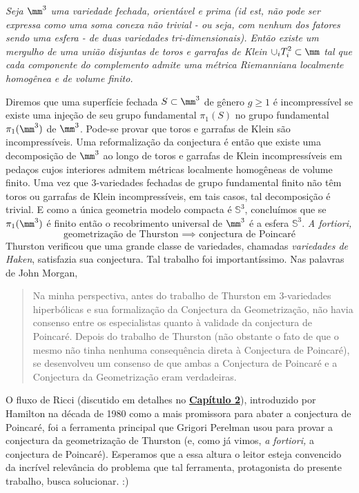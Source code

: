 \begin{conjec} \textit{
Seja $\mm^3$ uma variedade fechada, orientável e prima (id est, não pode ser expressa como uma soma conexa não trivial - ou seja, com nenhum dos fatores sendo uma esfera - de duas variedades tri-dimensionais). Então existe um mergulho de uma união disjuntas de toros e garrafas de Klein  $\displaystyle{\cup_{i} T_i^2 \subset \mm}$ tal que cada componente do complemento admite uma métrica Riemanniana localmente homogênea e de volume finito.}
\end{conjec}
Diremos que uma superfície fechada $S \subset \mm^3$ de gênero $g \geq 1$ é incompressível se existe uma injeção de seu grupo fundamental $\pi_1(S)$ no grupo fundamental $\pi_1(\mm^3)$ de $\mm^3$. Pode-se provar que toros e garrafas de Klein são incompressíveis. Uma reformalização da conjectura é então que existe uma decomposição de $\mm^3$ ao longo de toros e garrafas de Klein incompressíveis em pedaços cujos interiores admitem métricas localmente homogêneas de volume finito. Uma vez que $3$-variedades fechadas de grupo fundamental finito não têm toros ou garrafas de Klein incompressíveis, em tais casos, tal decomposição é trivial. E como a única geometria modelo compacta é $\mathbb{S}^3$, concluímos que se $\pi_1(\mm^3)$ é finito então o recobrimento universal de $\mm^3$ é a esfera $\mathbb{S}^3$. \emph{A fortiori,}
\[
\text{geometrização de Thurston $\implies$ conjectura de Poincaré}
\]
Thurston verificou que uma grande classe de variedades, chamadas \emph{variedades de Haken}, satisfazia sua conjectura. Tal trabalho foi importantíssimo. Nas palavras de John Morgan, 
\blockquote{
Na minha perspectiva, antes do trabalho de Thurston em $3$-variedades hiperbólicas e sua formalização da Conjectura da Geometrização, não havia consenso entre os especialistas quanto à validade da conjectura de Poincaré. Depois do trabalho de Thurston (não obstante o fato de que o mesmo não tinha nenhuma consequência direta à Conjectura de Poincaré), se desenvolveu um consenso de que ambas a Conjectura de Poincaré e a Conjectura da Geometrização eram verdadeiras.
}
O fluxo de Ricci (discutido em detalhes no \hyperref[cap:OFLUXO]{\textcolor{gal}{\textbf{Capítulo 2}}}), introduzido por Hamilton na década de 1980 como a  mais promissora para abater a conjectura de Poincaré, foi a ferramenta principal que Grigori Perelman usou para provar a conjectura da geometrização de Thurston (e, como já vimos, \emph{a fortiori,} a conjectura de Poincaré). Esperamos que a essa altura o leitor esteja convencido da incrível relevância do problema que tal ferramenta, protagonista do presente trabalho, busca solucionar. :) \par 
